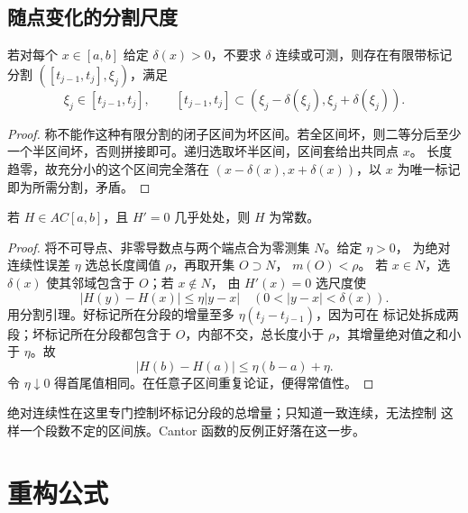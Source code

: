 \subsection{随点变化的分割尺度}

\begin{lemma}\label{lem:cousin-gauge}
若对每个 \(x\in[a,b]\) 给定 \(\delta(x)>0\)，不要求 \(\delta\) 连续或可测，则存在有限带标记分割
\(( [t_{j-1},t_j],\xi_j)\)，满足
\[
 \xi_j\in[t_{j-1},t_j],\qquad
 [t_{j-1},t_j]\subset(\xi_j-\delta(\xi_j),\xi_j+\delta(\xi_j)).
\]
\end{lemma}
\begin{proof}
称不能作这种有限分割的闭子区间为坏区间。若全区间坏，则二等分后至少
一个半区间坏，否则拼接即可。递归选取坏半区间，区间套给出共同点 \(x\)。
长度趋零，故充分小的这个区间完全落在
\((x-\delta(x),x+\delta(x))\)，以 \(x\) 为唯一标记即为所需分割，矛盾。
\end{proof}

\begin{theorem}\label{thm:ac-zero-derivative}
若 \(H\in AC[a,b]\)，且 \(H'=0\) 几乎处处，则 \(H\) 为常数。
\end{theorem}
\begin{proof}
将不可导点、非零导数点与两个端点合为零测集 \(N\)。给定 \(\eta>0\)，
为绝对连续性误差 \(\eta\) 选总长度阈值 \(\rho\)，再取开集 \(O\supset N\)，
\(m(O)<\rho\)。
若 \(x\in N\)，选 \(\delta(x)\) 使其邻域包含于 \(O\)；若 \(x\notin N\)，
由 \(H'(x)=0\) 选尺度使
\[
 |H(y)-H(x)|\le\eta|y-x|\quad(0<|y-x|<\delta(x)).
\]
用分割引理。好标记所在分段的增量至多 \(\eta(t_j-t_{j-1})\)，因为可在
标记处拆成两段；坏标记所在分段都包含于 \(O\)，内部不交，总长度小于
\(\rho\)，其增量绝对值之和小于 \(\eta\)。故
\[
 |H(b)-H(a)|\le\eta(b-a)+\eta.
\]
令 \(\eta\downarrow0\) 得首尾值相同。在任意子区间重复论证，便得常值性。
\end{proof}

绝对连续性在这里专门控制坏标记分段的总增量；只知道一致连续，无法控制
这样一个段数不定的区间族。Cantor 函数的反例正好落在这一步。

\section{重构公式}

